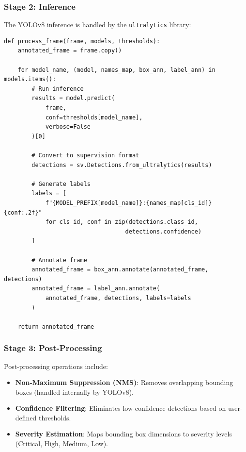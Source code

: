 \documentclass[12pt]{article}
\begin{document}
\subsubsection*{Stage 2: Inference}

The YOLOv8 inference is handled by the \texttt{ultralytics} library:

\begin{lstlisting}[caption={Detection Inference Call}, label={lst:inference}]
def process_frame(frame, models, thresholds):
    annotated_frame = frame.copy()
    
    for model_name, (model, names_map, box_ann, label_ann) in models.items():
        # Run inference
        results = model.predict(
            frame, 
            conf=thresholds[model_name], 
            verbose=False
        )[0]
        
        # Convert to supervision format
        detections = sv.Detections.from_ultralytics(results)
        
        # Generate labels
        labels = [
            f"{MODEL_PREFIX[model_name]}:{names_map[cls_id]} {conf:.2f}"
            for cls_id, conf in zip(detections.class_id, 
                                   detections.confidence)
        ]
        
        # Annotate frame
        annotated_frame = box_ann.annotate(annotated_frame, detections)
        annotated_frame = label_ann.annotate(
            annotated_frame, detections, labels=labels
        )
    
    return annotated_frame
\end{lstlisting}

\subsubsection*{Stage 3: Post-Processing}

Post-processing operations include:

\begin{itemize}
    \item \textbf{Non-Maximum Suppression (NMS)}: Removes overlapping bounding boxes (handled internally by YOLOv8).
    \item \textbf{Confidence Filtering}: Eliminates low-confidence detections based on user-defined thresholds.
    \item \textbf{Severity Estimation}: Maps bounding box dimensions to severity levels (Critical, High, Medium, Low).
\end{itemize}
\end{document}
